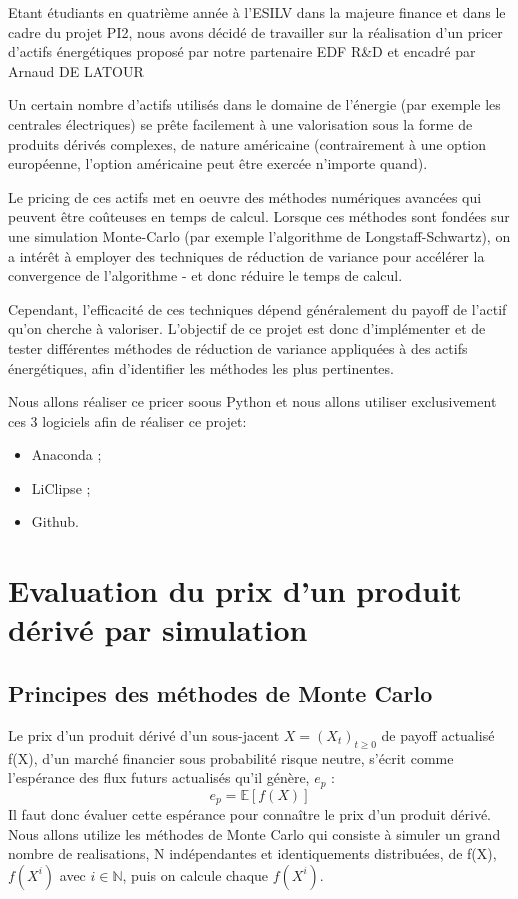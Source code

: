 \documentclass[12pt]{report}
\begin{document}
Etant étudiants en quatrième année à l’ESILV dans la majeure finance et
dans le cadre du projet PI2, nous avons décidé de travailler sur la
réalisation d’un pricer d’actifs énergétiques proposé par notre partenaire EDF R\&D et encadré par Arnaud DE LATOUR

Un certain nombre d'actifs utilisés dans le domaine de l'énergie (par exemple les
centrales électriques) se prête facilement à une valorisation sous la forme de
produits dérivés complexes, de nature américaine (contrairement à une option
européenne, l'option américaine peut être exercée n'importe quand).

Le pricing de ces actifs met en oeuvre des méthodes numériques avancées qui
peuvent être coûteuses en temps de calcul. Lorsque ces méthodes sont fondées sur
une simulation Monte-Carlo (par exemple l'algorithme de Longstaff-Schwartz), on a
intérêt à employer des techniques de réduction de variance pour accélérer la
convergence de l'algorithme - et donc réduire le temps de calcul.

Cependant, l'efficacité de ces techniques dépend généralement du payoff de l'actif
qu'on cherche à valoriser. L'objectif de ce projet est donc d'implémenter et de
tester différentes méthodes de réduction de variance appliquées à des actifs
énergétiques, afin d'identifier les méthodes les plus pertinentes.

Nous allons réaliser ce pricer soous Python et nous allons utiliser exclusivement
ces 3 logiciels afin de réaliser ce projet:
\begin{itemize}
	\item Anaconda ;
	\item LiClipse ;
	\item Github.
\end{itemize}

\chapter{Evaluation du prix d'un produit dérivé par simulation}

\section{Principes des méthodes de Monte Carlo}

Le prix d'un produit dérivé d'un sous-jacent $X=(X_t)_{t\geq0}$ de payoff actualisé f(X), d'un marché financier sous probabilité risque neutre, s’écrit
comme l’espérance des flux futurs actualisés qu’il génère, $e_p$ :
\begin{equation}
	e_p = \mathbb{E}[f(X)]
\end{equation}
Il faut donc évaluer cette espérance pour connaître le prix d’un produit dérivé.
Nous allons utilize les méthodes de Monte Carlo qui consiste à simuler un grand
nombre de realisations, N indépendantes et identiquements distribuées, de f(X),
$f(X^i)$ avec $i\in \mathbb{N}$, puis on calcule chaque $f(X^i)$.
\end{document}
